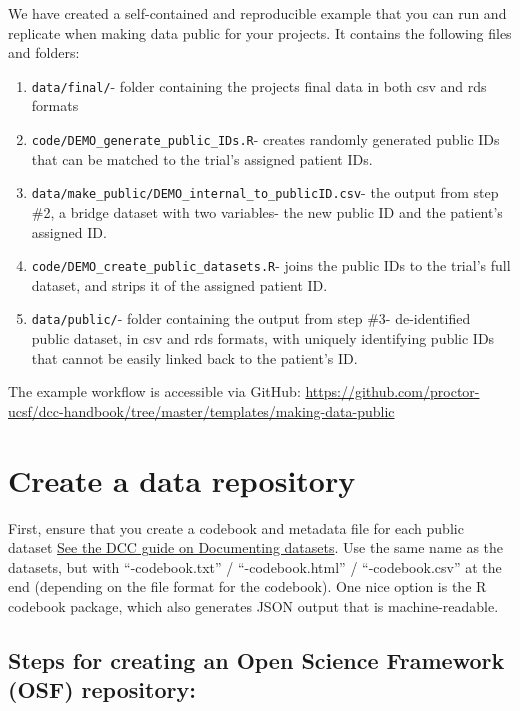 \documentclass[
]{book}
\providecommand{\tightlist}{%
  \setlength{\itemsep}{0pt}\setlength{\parskip}{0pt}}
\begin{document}
We have created a self-contained and reproducible example that you can run and replicate when making data public for your projects. It contains the following files and folders:

\begin{enumerate}
\def\labelenumi{\arabic{enumi}.}
\tightlist
\item
  \texttt{data/final/}- folder containing the projects final data in both csv and rds formats\\
\item
  \texttt{code/DEMO\_generate\_public\_IDs.R}- creates randomly generated public IDs that can be matched to the trial's assigned patient IDs.\\
\item
  \texttt{data/make\_public/DEMO\_internal\_to\_publicID.csv}- the output from step \#2, a bridge dataset with two variables- the new public ID and the patient's assigned ID.\\
\item
  \texttt{code/DEMO\_create\_public\_datasets.R}- joins the public IDs to the trial's full dataset, and strips it of the assigned patient ID.
\item
  \texttt{data/public/}- folder containing the output from step \#3- de-identified public dataset, in csv and rds formats, with uniquely identifying public IDs that cannot be easily linked back to the patient's ID.
\end{enumerate}

The example workflow is accessible via GitHub: \url{https://github.com/proctor-ucsf/dcc-handbook/tree/master/templates/making-data-public}

\section{Create a data repository}\label{create-a-data-repository}

First, ensure that you create a codebook and metadata file for each public dataset \href{https://proctor-ucsf.github.io/dcc-handbook/datawrangling.html\#documenting-datasets}{See the DCC guide on Documenting datasets}. Use the same name as the datasets, but with ``-codebook.txt'' / ``-codebook.html'' / ``-codebook.csv'' at the end (depending on the file format for the codebook). One nice option is the R codebook package, which also generates JSON output that is machine-readable.

\subsection{Steps for creating an Open Science Framework (OSF) repository:}\label{steps-for-creating-an-open-science-framework-osf-repository}
\end{document}
